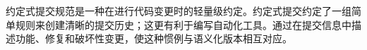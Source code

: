 
\begin{issues}
\issueDraft
\issueTODO
\end{issues}

约定式提交规范是一种在进行代码变更时的轻量级约定。约定式提交约定了一组简单规则来创建清晰的提交历史；这更有利于编写自动化工具。通过在提交信息中描述功能、修复和破坏性变更，使这种惯例与语义化版本相互对应。

